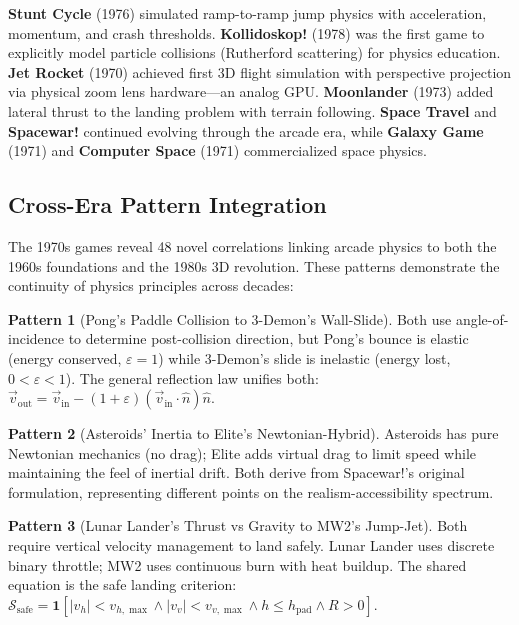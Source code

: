 \documentclass[11pt,a4paper]{article}
\theoremstyle{definition}
\newtheorem{pattern}{Pattern}[section]
\begin{document}
\textbf{Stunt Cycle} (1976) simulated ramp-to-ramp jump physics with acceleration, momentum, and crash thresholds. \textbf{Kollidoskop!} (1978) was the first game to explicitly model particle collisions (Rutherford scattering) for physics education. \textbf{Jet Rocket} (1970) achieved first 3D flight simulation with perspective projection via physical zoom lens hardware---an analog GPU. \textbf{Moonlander} (1973) added lateral thrust to the landing problem with terrain following. \textbf{Space Travel} and \textbf{Spacewar!} continued evolving through the arcade era, while \textbf{Galaxy Game} (1971) and \textbf{Computer Space} (1971) commercialized space physics.

\subsection{Cross-Era Pattern Integration}

The 1970s games reveal 48 novel correlations linking arcade physics to both the 1960s foundations and the 1980s 3D revolution. These patterns demonstrate the continuity of physics principles across decades:

\begin{pattern}[Pong's Paddle Collision to 3-Demon's Wall-Slide]
Both use angle-of-incidence to determine post-collision direction, but Pong's bounce is elastic (energy conserved, $\varepsilon=1$) while 3-Demon's slide is inelastic (energy lost, $0 < \varepsilon < 1$). The general reflection law unifies both: $\vec{v}_{\text{out}} = \vec{v}_{\text{in}} - (1+\varepsilon)(\vec{v}_{\text{in}}\cdot\hat{n})\hat{n}$.
\end{pattern}

\begin{pattern}[Asteroids' Inertia to Elite's Newtonian-Hybrid]
Asteroids has pure Newtonian mechanics (no drag); Elite adds virtual drag to limit speed while maintaining the feel of inertial drift. Both derive from Spacewar!'s original formulation, representing different points on the realism-accessibility spectrum.
\end{pattern}

\begin{pattern}[Lunar Lander's Thrust vs Gravity to MW2's Jump-Jet]
Both require vertical velocity management to land safely. Lunar Lander uses discrete binary throttle; MW2 uses continuous burn with heat buildup. The shared equation is the safe landing criterion: $\mathcal{S}_{\text{safe}} = \mathbf{1}[|v_h| < v_{h,\max} \land |v_v| < v_{v,\max} \land h \leq h_{\text{pad}} \land R > 0]$.
\end{pattern}
\end{document}
